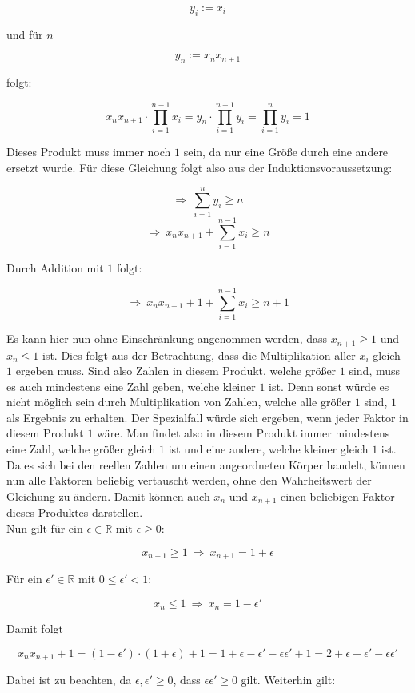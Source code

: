 \documentclass[11pt, a4paper]{article}
\begin{document}
		\[ y_i := x_i \]

		und für $n$

		\[ y_n := x_nx_{n+1} \]

		folgt:

		\[ x_nx_{n+1}\cdot \prod_{i=1}^{n-1} x_i = y_n \cdot \prod_{i=1}^{n-1} y_i = \prod_{i=1}^{n} y_i = 1 \]

		Dieses Produkt muss immer noch $1$ sein, da nur eine Größe durch eine andere ersetzt wurde. Für diese Gleichung folgt also aus der Induktionsvoraussetzung:

		\[ \Rightarrow \ \sum_{i=1}^n y_i \geq n \]
		\[ \Rightarrow \ x_nx_{n+1} + \sum_{i=1}^{n-1} x_i \geq n \]

		Durch Addition mit $1$ folgt:

		\[ \Rightarrow \ x_nx_{n+1} + 1 + \sum_{i=1}^{n-1} x_i \geq n+1 \]

		Es kann hier nun ohne Einschränkung angenommen werden, dass $x_{n+1} \geq 1$ und $x_n \leq 1$ ist. Dies folgt aus der Betrachtung, dass die Multiplikation aller $x_i$ gleich $1$ ergeben muss.
		Sind also Zahlen in diesem Produkt, welche größer $1$ sind, muss es auch mindestens eine Zahl geben, welche kleiner $1$ ist. Denn sonst würde es nicht möglich sein durch Multiplikation von Zahlen, welche alle größer $1$ sind, $1$ als Ergebnis zu erhalten. Der Spezialfall würde sich ergeben, wenn jeder Faktor in diesem Produkt $1$ wäre. Man findet also in diesem Produkt immer mindestens eine Zahl, welche größer gleich $1$ ist und eine andere, welche kleiner gleich $1$ ist. Da es sich bei den reellen Zahlen um einen angeordneten Körper handelt, können nun alle Faktoren beliebig vertauscht werden, ohne den Wahrheitswert der Gleichung zu ändern. Damit können auch $x_n$ und $x_{n+1}$ einen beliebigen Faktor dieses Produktes darstellen. \\


		Nun gilt für ein $\epsilon \in \mathbb{R}$ mit $\epsilon \geq 0$:

		\[ x_{n+1} \geq 1 \ \Rightarrow \ x_{n+1} = 1 + \epsilon \]

		Für ein $\epsilon' \in \mathbb{R}$ mit $0 \leq \epsilon' < 1$:

		\[ x_n \leq 1 \ \Rightarrow \ x_n = 1-\epsilon' \]

		Damit folgt 

		\[ x_nx_{n+1} + 1 = (1-\epsilon')\cdot(1+\epsilon) +1 = 1 + \epsilon -\epsilon' - \epsilon\epsilon' + 1 = 2 + \epsilon -\epsilon' - \epsilon\epsilon' \]

		Dabei ist zu beachten, da $\epsilon,\epsilon' \geq 0$, dass $\epsilon\epsilon' \geq 0$ gilt. Weiterhin gilt:
\end{document}

